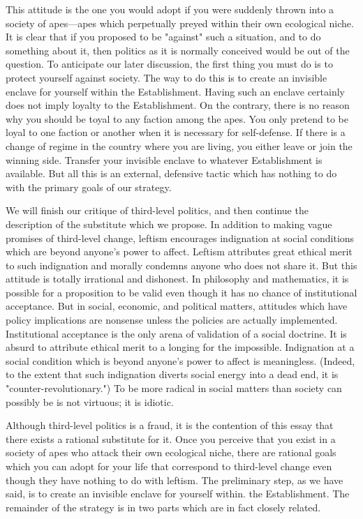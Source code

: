 \documentclass[10pt,twoside,draft]{memoir}
\begin{document}
{{{{This attitude is the one you would adopt if you were suddenly thrown 
into a society of apes---apes which perpetually preyed within their own 
ecological niche. It is clear that if you proposed to be "against" such a 
situation, and to do something about it, then politics as it is normally 
conceived would be out of the question. To anticipate our later discussion, 
the first thing you must do is to protect yourself against society. The way to 
do this is to create an invisible enclave for yourself within the Establishment. 
Having such an enclave certainly does not imply loyalty to the 
Establishment. On the contrary, there is no reason why you should be toyal 
to any faction among the apes. You only pretend to be loyal to one faction 
or another when it is necessary for self-defense. If there is a change of regime 
in the country where you are living, you either leave or join the winning side. 
Transfer your invisible enclave to whatever Establishment is available. But all 
this is an external, defensive tactic which has nothing to do with the primary 
goals of our strategy. 

We will finish our critique of third-level politics, and then continue the 
description of the substitute which we propose. In addition to making vague 
promises of third-level change, leftism encourages indignation at social 
conditions which are beyond anyone's power to affect. Leftism attributes 
great ethical merit to such indignation and morally condemns anyone who 
does not share it. But this attitude is totally irrational and dishonest. In 
philosophy and mathematics, it is possible for a proposition to be valid even 
though it has no chance of institutional acceptance. But in social, economic, 
and political matters, attitudes which have policy implications are nonsense 
unless the policies are actually implemented. Institutional acceptance is the 
only arena of validation of a social doctrine. It is absurd to attribute ethical 
merit to a longing for the impossible. Indignation at a social condition which 
is beyond anyone's power to affect is meaningless. (Indeed, to the extent 
that such indignation diverts social energy into a dead end, it is 
"counter-revolutionary.") To be more radical in social matters than society 
can possibly be is not virtuous; it is idiotic. 

Although third-level politics is a fraud, it is the contention of this essay 
that there exists a rational substitute for it. Once you perceive that you exist 
in a society of apes who attack their own ecological niche, there are rational 
goals which you can adopt for your life that correspond to third-level change 
even though they have nothing to do with leftism. The preliminary step, as 
we have said, is to create an invisible enclave for yourself within. the 
Establishment. The remainder of the strategy is in two parts which are in 
fact closely related. 

}}}}
\end{document}
